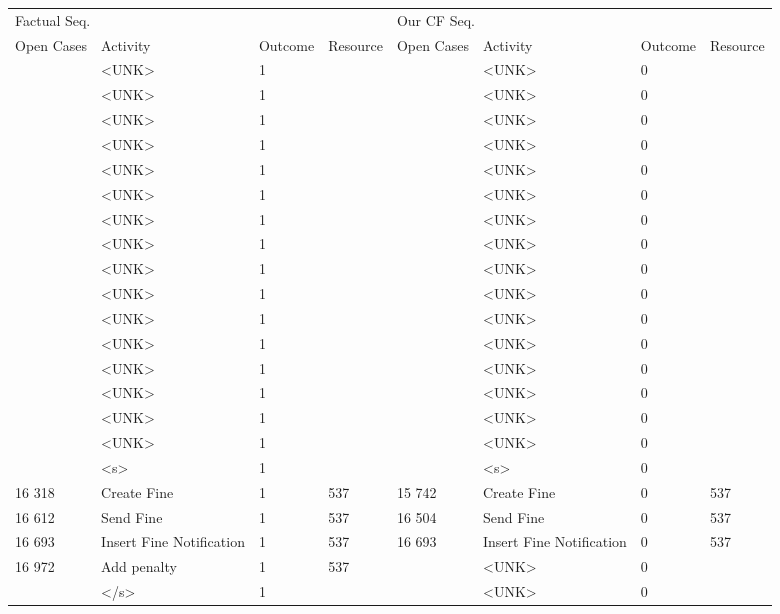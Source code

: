 \begin{tabular}{llllllll}
\toprule
\multicolumn{4}{l}{Factual Seq.} & \multicolumn{4}{l}{Our CF Seq.} \\
Open Cases & Activity & Outcome & Resource & Open Cases & Activity & Outcome & Resource \\
\midrule
 & <UNK> & 1 &  &  & <UNK> & 0 &  \\
 & <UNK> & 1 &  &  & <UNK> & 0 &  \\
 & <UNK> & 1 &  &  & <UNK> & 0 &  \\
 & <UNK> & 1 &  &  & <UNK> & 0 &  \\
 & <UNK> & 1 &  &  & <UNK> & 0 &  \\
 & <UNK> & 1 &  &  & <UNK> & 0 &  \\
 & <UNK> & 1 &  &  & <UNK> & 0 &  \\
 & <UNK> & 1 &  &  & <UNK> & 0 &  \\
 & <UNK> & 1 &  &  & <UNK> & 0 &  \\
 & <UNK> & 1 &  &  & <UNK> & 0 &  \\
 & <UNK> & 1 &  &  & <UNK> & 0 &  \\
 & <UNK> & 1 &  &  & <UNK> & 0 &  \\
 & <UNK> & 1 &  &  & <UNK> & 0 &  \\
 & <UNK> & 1 &  &  & <UNK> & 0 &  \\
 & <UNK> & 1 &  &  & <UNK> & 0 &  \\
 & <UNK> & 1 &  &  & <UNK> & 0 &  \\
 & <s> & 1 &  &  & <s> & 0 &  \\
16 318 & Create Fine & 1 & 537 & 15 742 & Create Fine & 0 & 537 \\
16 612 & Send Fine & 1 & 537 & 16 504 & Send Fine & 0 & 537 \\
16 693 & Insert Fine Notification & 1 & 537 & 16 693 & Insert Fine Notification & 0 & 537 \\
16 972 & Add penalty & 1 & 537 &  & <UNK> & 0 &  \\
 & </s> & 1 &  &  & <UNK> & 0 &  \\
\bottomrule
\end{tabular}
